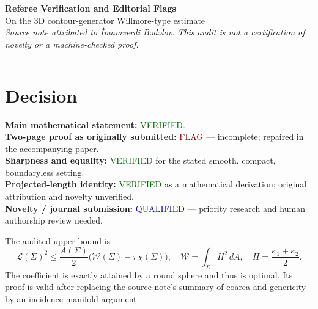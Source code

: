 \documentclass[11pt,a4paper]{article}
\newcommand{\pass}{\textcolor{darkgreen}{\textsf{VERIFIED}}}
\newcommand{\flag}{\textcolor{darkred}{\textsf{FLAG}}}
\newcommand{\qual}{\textcolor{darkblue}{\textsf{QUALIFIED}}}
\begin{document}
{\sffamily\Large\bfseries Referee Verification and Editorial Flags}\\[5pt]
{\large On the 3D contour-generator Willmore-type estimate}\\[3pt]
\emph{Source note attributed to İmamverdi Bədəlov. This audit is not a certification of novelty or a machine-checked proof.}
\smallskip\hrule\bigskip
\section*{Decision}
\textbf{Main mathematical statement:} \pass.\\
\textbf{Two-page proof as originally submitted:} \flag{} --- incomplete; repaired in the accompanying paper.\\
\textbf{Sharpness and equality:} \pass{} for the stated smooth, compact, boundaryless setting.\\
\textbf{Projected-length identity:} \pass{} as a mathematical derivation; original attribution and novelty unverified.\\
\textbf{Novelty / journal submission:} \qual{} --- priority research and human authorship review needed.

The audited upper bound is
\[
\boxed{\quad\mathcal L(\Sigma)^2\leq\frac{A(\Sigma)}2\bigl(\mathcal W(\Sigma)-\pi\chi(\Sigma)\bigr),\quad
\mathcal W=\int_\Sigma H^2\,dA,\quad H=\frac{\kappa_1+\kappa_2}{2}.\quad}
\]
The coefficient is exactly attained by a round sphere and thus is optimal. Its proof is valid after replacing the source note's summary of coarea and genericity by an incidence-manifold argument.
\end{document}
